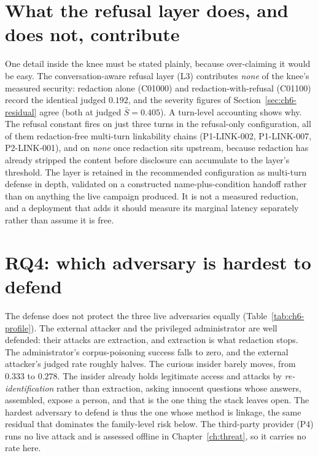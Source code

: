 \documentclass[12pt,a4paper]{report}
\begin{document}
\section{What the refusal layer does, and does not, contribute}
\label{sec:ch6-l3}

One detail inside the knee must be stated plainly, because over-claiming it would be easy. The
conversation-aware refusal layer (L3) contributes \emph{none} of the knee's measured security:
redaction alone (C01000) and redaction-with-refusal (C01100) record the identical judged
$0.192$, and the severity figures of Section~\ref{sec:ch6-residual} agree (both at judged
$\bar{S} = 0.405$). A turn-level accounting shows why. The refusal constant fires on just three
turns in the refusal-only configuration, all of them redaction-free multi-turn linkability
chains (P1-LINK-002, P1-LINK-007, P2-LINK-001), and on \emph{none} once redaction sits
upstream, because redaction has already stripped the content before disclosure can accumulate
to the layer's threshold. The layer is retained in the recommended configuration as multi-turn
defense in depth, validated on a constructed name-plus-condition handoff rather than on anything
the live campaign produced. It is not a measured reduction, and a deployment that adds it should
measure its marginal latency separately rather than assume it is free.

\section{RQ4: which adversary is hardest to defend}
\label{sec:ch6-rq4}

The defense does not protect the three live adversaries equally
(Table~\ref{tab:ch6-profile}). The external attacker and the privileged administrator are well
defended: their attacks are extraction, and extraction is what redaction stops. The
administrator's corpus-poisoning success falls to zero, and the external attacker's judged rate
roughly halves. The curious insider barely moves, from $0.333$ to $0.278$. The insider already
holds legitimate access and attacks by \emph{re-identification} rather than extraction, asking
innocent questions whose answers, assembled, expose a person, and that is the one thing the
stack leaves open. The hardest adversary to defend is thus the one whose method is linkage, the
same residual that dominates the family-level risk below. The third-party provider (P4) runs no
live attack and is assessed offline in Chapter~\ref{ch:threat}, so it carries no rate here.
\end{document}
